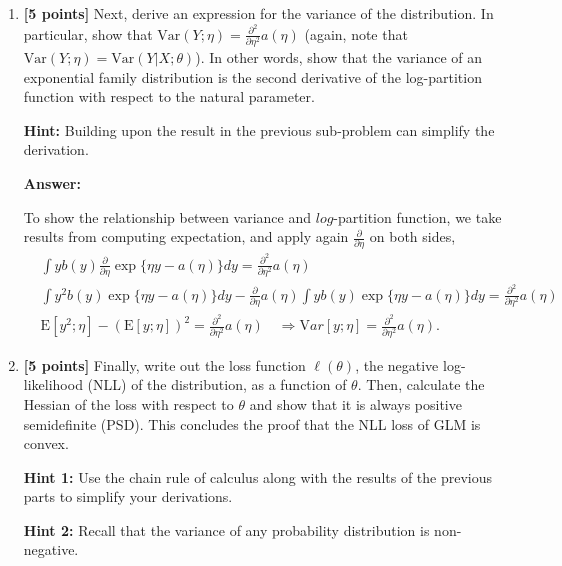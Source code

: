 \documentclass{article}
\begin{document}
\begin{enumerate}[label=\alph*)]



\item \textbf{[5 points]} Next, derive an expression for the variance of the distribution. In particular, show that $\text{Var}(Y ; \eta) = \frac{\partial^2}{\partial \eta^2} a(\eta)$ (again, note that $\text{Var}(Y ; \eta) = \text{Var}(Y |X; \theta)$). In other words, show that the variance of an exponential family distribution is the second derivative of the log-partition function with respect to the natural parameter.

\textbf{Hint:} Building upon the result in the previous sub-problem can simplify the derivation.

\textbf{Answer:}



To show the relationship between variance and $log$-partition function, we take results from computing expectation, and apply again $\frac{\partial}{\partial\eta}$  on both sides,
\begin{align*}
&\int y b(y)\frac{\partial}{\partial \eta}\exp\{\eta y - a(\eta)\}dy =  \frac{\partial^2}{\partial \eta^2}a(\eta)\\[8pt]
 &\int y^2b(y)\exp\{\eta y - a(\eta)\}dy - \frac{\partial}{\partial \eta}a(\eta)\int yb(y)\exp\{\eta y - a(\eta)\}dy=\frac{\partial^2}{\partial \eta^2}a(\eta)\\[8pt]
 &\mathrm{E}[y^2;\eta] - \left(\mathrm{E}[y;\eta]\right)^2=\frac{\partial^2}{\partial \eta^2}a(\eta)\quad\Rightarrow \boxed{\mathrm{V}ar[y;\eta] = \frac{\partial^2}{\partial \eta^2}a(\eta).}
\end{align*}




\item \textbf{[5 points]} Finally, write out the loss function $\ell(\theta)$, the negative log-likelihood (NLL) of the distribution, as a function of $\theta$. Then, calculate the Hessian of the loss with respect to $\theta$ and show that it is always positive semidefinite (PSD). This concludes the proof that the NLL loss of GLM is convex.

\textbf{Hint 1:} Use the chain rule of calculus along with the results of the previous parts to simplify your derivations.

\textbf{Hint 2:} Recall that the variance of any probability distribution is non-negative.


\end{enumerate}
\end{document}
